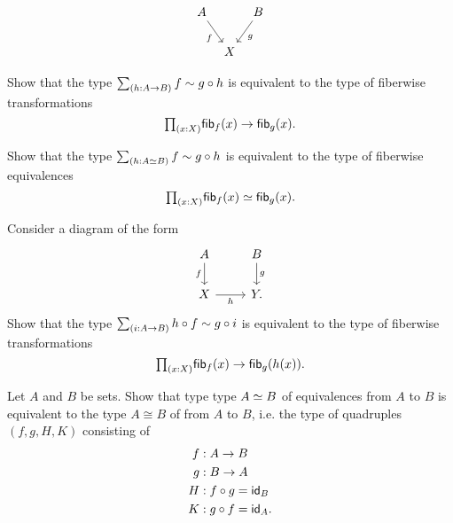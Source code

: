 \begin{exercises}
\begin{equation*}
\begin{tikzcd}[column sep=tiny]
A \arrow[dr,swap,"f"] & & B \arrow[dl,"g"] \\
& X
\end{tikzcd}
\end{equation*}
\begin{subexenum}
\item Show that the type $\sm{h:A\to B} f\htpy g\circ h$ is equivalent to the type of fiberwise transformations
\begin{equation*}
\prd{x:X}\fib{f}{x}\to\fib{g}{x}.
\end{equation*}
\item Show that the type $\sm{h:\eqv{A}{B}} f\htpy g\circ h$ is equivalent to the type of fiberwise equivalences
\begin{equation*}
\prd{x:X}\fib{f}{x}\eqvsym\fib{g}{x}.
\end{equation*}
\end{subexenum}
\item \label{ex:sq_fib}Consider a diagram of the form
\begin{equation*}
\begin{tikzcd}
A \arrow[d,swap,"f"] & B \arrow[d,"g"] \\
X \arrow[r,swap,"h"] & Y.
\end{tikzcd}
\end{equation*}
Show that the type $\sm{i:A\to B}h\circ f\htpy g\circ i$ is equivalent to the type of fiberwise transformations
\begin{equation*}
\prd{x:X}\fib{f}{x}\to\fib{g}{h(x)}.
\end{equation*}
\item \label{ex:iso_equiv}Let $A$ and $B$ be sets. Show that type type $\eqv{A}{B}$ of equivalences from $A$ to $B$ is equivalent to the type $A\cong B$ of  from $A$ to $B$, i.e. the type of quadruples $(f,g,H,K)$ consisting of
\begin{align*}
f & : A\to B \\
g & : B\to A \\
H & : f\circ g = \idfunc[B] \\
K & : g\circ f = \idfunc[A].
\end{align*}
\end{exercises}
